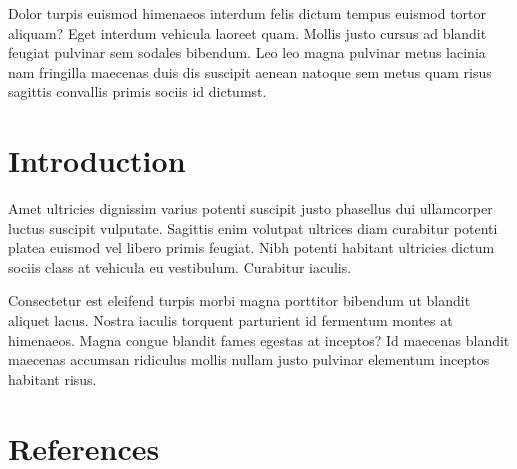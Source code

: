 \documentclass[
]{article}
\newlength{\cslhangindent}
\newlength{\cslentryspacingunit} %
\newenvironment{CSLReferences}[2] %
 {%
  \setlength{\parindent}{0pt}
  \ifodd #1
  \let\oldpar\par
  \def\par{\hangindent=\cslhangindent\oldpar}
  \fi
  \setlength{\parskip}{#2\cslentryspacingunit}
 }%
 {}
\begin{document}
Dolor turpis euismod himenaeos interdum felis dictum tempus euismod
tortor aliquam? Eget interdum vehicula laoreet quam. Mollis justo cursus
ad blandit feugiat pulvinar sem sodales bibendum. Leo leo magna pulvinar
metus lacinia nam fringilla maecenas duis dis suscipit aenean natoque
sem metus quam risus sagittis convallis primis sociis id dictumst.

\hypertarget{introduction}{%
\section{Introduction}\label{introduction}}

Amet ultricies dignissim varius potenti suscipit justo phasellus dui
ullamcorper luctus suscipit vulputate. Sagittis enim volutpat ultrices
diam curabitur potenti platea euismod vel libero primis feugiat. Nibh
potenti habitant ultricies dictum sociis class at vehicula eu
vestibulum. Curabitur iaculis.

Consectetur est eleifend turpis morbi magna porttitor bibendum ut
blandit aliquet lacus. Nostra iaculis torquent parturient id fermentum
montes at himenaeos. Magna congue blandit fames egestas at inceptos? Id
maecenas blandit maecenas accumsan ridiculus mollis nullam justo
pulvinar elementum inceptos habitant risus.

\newpage{}

\hypertarget{references}{%
\section*{References}\label{references}}

\hypertarget{refs}{}
\begin{CSLReferences}{0}{0}
\end{CSLReferences}
\end{document}
